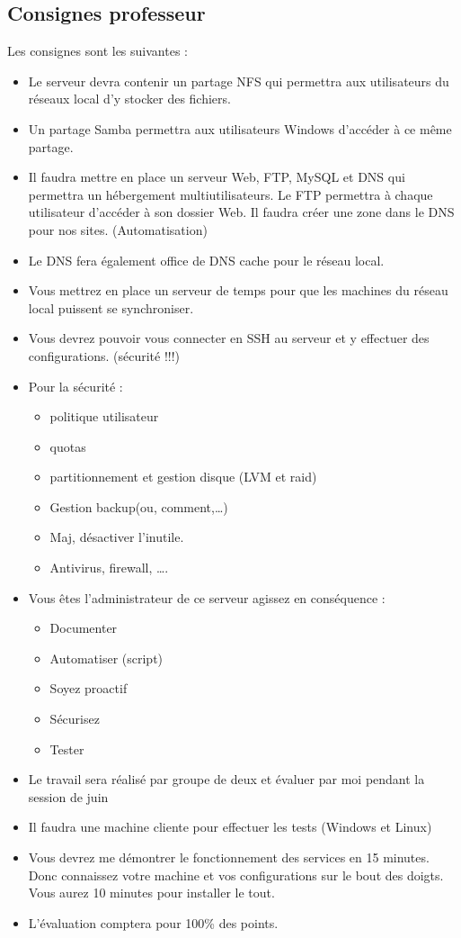 \documentclass{article}
\begin{document}
	\subsection{Consignes professeur}
	
	Les consignes sont les suivantes : 
	
	\begin{itemize}
		\item Le serveur devra contenir un partage NFS qui permettra aux utilisateurs du réseaux local d’y stocker des fichiers.
		\item Un partage Samba permettra aux utilisateurs Windows d’accéder à ce même partage.
		\item Il faudra mettre en place un serveur Web, FTP, MySQL et DNS qui permettra un hébergement multiutilisateurs. Le FTP permettra à chaque utilisateur d’accéder à son dossier Web. Il faudra créer une zone dans le DNS pour nos sites. (Automatisation)
		\item Le DNS fera également office de DNS cache pour le réseau local.
		\item Vous mettrez en place un serveur de temps pour que les machines du réseau local puissent se synchroniser.
		\item Vous devrez pouvoir vous connecter en SSH au serveur et y effectuer des configurations. (sécurité !!!)
		\item Pour la sécurité :
		\begin{itemize}
			\item politique utilisateur
			\item quotas
			\item partitionnement et gestion disque (LVM et raid)
			\item Gestion backup(ou, comment,…)
			\item Maj, désactiver l’inutile.
			\item Antivirus, firewall, ….
		\end{itemize}
		\newpage
		\item Vous êtes l’administrateur de ce serveur agissez en conséquence :
		\begin{itemize}
			\item Documenter
			\item Automatiser (script)
			\item Soyez proactif
			\item Sécurisez
			\item Tester
		\end{itemize}
		\item Le travail sera réalisé par groupe de deux et évaluer par moi pendant la session de juin
		\item Il faudra une machine cliente pour effectuer les tests (Windows et Linux)
		\item Vous devrez me démontrer le fonctionnement des services en 15 minutes. Donc connaissez votre machine et vos configurations sur le bout des doigts. Vous aurez 10 minutes pour installer le tout.
		\item L’évaluation comptera pour 100\% des points. 
		
	\end{itemize}
	
\end{document}
